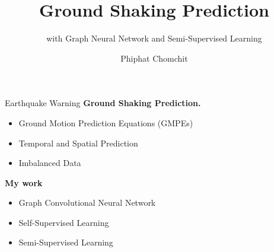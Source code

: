 \documentclass{beamer}
\title{Ground Shaking Prediction}
\subtitle{with Graph Neural Network and Semi-Supervised Learning}
\author{Phiphat Chomchit}
\institute{Chiang Mai University}
\begin{document}
	
	\begin{frame}
		\titlepage
	\end{frame}
	
	\begin{frame}[t]{Earthquake Warning}
		\centering
		\textbf{Ground Shaking Prediction.}
		\begin{itemize}
			\item Ground Motion Prediction Equations (GMPEs)
			\item Temporal and Spatial Prediction
			\item Imbalanced Data
		\end{itemize}
		\textbf{My work}
		\begin{itemize}
			\item Graph Convolutional Neural Network 
			\item Self-Supervised Learning
			\item Semi-Supervised Learning
		\end{itemize}
	\end{frame}
\end{document}
